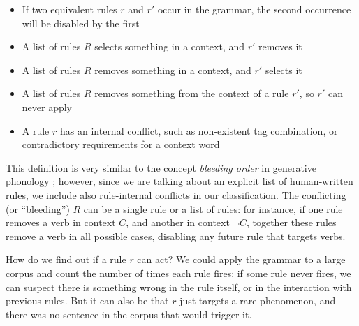 \begin{itemize}
\item If two equivalent rules $r$ and $r'$ occur in the grammar, the second occurrence will be disabled by the first
\item A list of rules $R$ selects something in a context, and $r'$ removes it
\item A list of rules $R$ removes something in a context, and $r'$ selects it
\item A list of rules $R$ removes something from the context of a rule $r'$, so $r'$ can never apply
\item A rule $r$ has an internal conflict, such as non-existent
tag combination, or contradictory requirements for a context word
\end{itemize}

This definition is very similar to the concept \emph{bleeding order}
in generative phonology \cite{kiparsky1968}; however, since we are
talking about an explicit list of human-written rules, we include also
rule-internal conflicts in our classification. The conflicting (or
``bleeding'') $R$ can be a single rule or a list of rules: for
instance, if one rule removes a verb in context $C$, and another in
context $\neg C$, together these rules remove a verb in all possible
cases, disabling any future rule that targets verbs.



How do we find out if a rule $r$ can act? 
We could apply the grammar to a large corpus and count the number of times 
each rule fires; if some rule never fires, we can suspect there is something wrong 
in the rule itself, or in the interaction with previous rules. 
But it can also be that $r$ just targets a rare phenomenon, and there was no sentence in the corpus that would trigger it.

